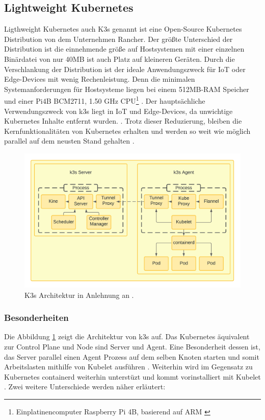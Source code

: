 \subsection{Lightweight Kubernetes} \label{k3s}
Ligthweight Kubernetes auch K3s genannt ist eine Open-Source Kubernetes Distribution von dem Unternehmen
Rancher. Der größte Unterschied der Distribution ist die einnehmende größe 
auf Hostsystemen mit einer einzelnen Binärdatei von nur 40MB ist auch Platz auf kleineren Geräten.
Durch die Verschlankung der Distribution ist der ideale Anwendungszweck für IoT oder Edge-Devices mit wenig Rechenleistung.
Denn die minimalen Systemanforderungen für Hostsysteme liegen bei einem 512MB-RAM Speicher und einer Pi4B BCM2711, 1.50 GHz CPU\footnote{Einplatinencomputer Raspberry Pi 4B, basierend auf ARM \cite{pi4} } \cite{k3sAnforderung}.
Der hauptsächliche Verwendungszweck von k3s liegt in IoT und Edge-Devices, da unwichtige Kubernetes Inhalte entfernt wurden. \cite{k3s}.
Trotz dieser Reduzierung, bleiben die Kernfunktionalitäten von Kubernetes erhalten und werden 
so weit wie möglich parallel auf dem neusten Stand gehalten \cite{k3sgit}.

\begin{figure}
  \centering
  \includegraphics[width=1.0\columnwidth]{images/K3sArchitektur.png}
  \caption{K3s Architektur in Anlehnung an \cite{k3s}.}
  \label{fig:k3sarchitektur}
\end{figure}

\subsubsection{Besonderheiten}
Die Abbildung \ref{fig:k3sarchitektur} zeigt die Architektur von k3s auf. Das Kubernetes äquivalent zur Control Plane und Node
sind Server und Agent. Eine Besonderheit dessen ist, das Server parallel einen Agent Prozess auf dem selben Knoten starten und
somit Arbeitslasten mithilfe von Kubelet ausführen \cite{k3sServerAgent}. Weiterhin wird im Gegensatz zu Kubernetes containerd weiterhin unterstüzt und
kommt vorinstalliert mit Kubelet \cite{k3s}. Zwei weitere Unterschiede werden näher erläutert:

